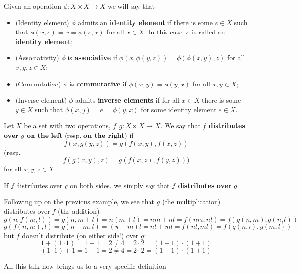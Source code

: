 \begin{df}
	Given an operation $\phi:X\times X\to X$ we will say that
	\begin{itemize}
		\item (Identity element) $\phi$ admits an \textbf{identity element} if there is some $e\in X$ such that $\phi(x,e)=x=\phi(e,x)$ for all $x\in X$. In this case, $e$ is called an \textbf{identity element};
		\item (Associativity) $\phi$ is \textbf{associative} if $\phi(x,\phi(y,z))=\phi(\phi(x,y),z)$ for all $x,y,z\in X$;
		\item (Commutative) $\phi$ is \textbf{commutative} if $\phi(x,y)=\phi(y,x)$ for all $x,y\in X$;
		\item (Inverse element) $\phi$ admits \textbf{inverse elements} if for all $x\in X$ there is some $y\in X$ such that $\phi(x,y)=e=\phi(y,x)$ for some identity element $e\in X$.
	\end{itemize}
\end{df}

\begin{df}
	Let $X$ be a set with two operations, $f,g:X\times X\to X$. We say that \textbf{$f$ distributes over $g$ on the left} (resp. \textbf{on the right}) if $$f(x,g(y,z))=g(f(x,y),f(x,z))$$ (resp. $$f(g(x,y),z)=g(f(x,z),f(y,z)))$$ for all $x,y,z\in X$.
	
	If $f$ distributes over $g$ on both sides, we simply say that \textbf{$f$ distributes over $g$}.
\end{df}
\begin{ex}
	Following up on the previous example, we see that $g$ (the multiplication) distributes over $f$ (the addition):
	\[g(n,f(m,l))=g(n,m+l)=n(m+l)=nm+nl=f(nm,nl)=f(g(n,m),g(n,l))\]
	\[g(f(n,m),l)=g(n+m,l)=(n+m)l=nl+ml=f(nl,ml)=f(g(n,l),g(m,l))\]but $f$ doesn't distribute (on either side!) over $g$:
	\[1+(1\cdot 1)=1+1=2\neq 4=2\cdot 2=(1+1)\cdot(1+1)\]
	\[(1\cdot 1)+1=1+1=2\neq 4=2\cdot 2=(1+1)\cdot(1+1)\]
\end{ex}

All this talk now brings us to a very specific definition:

